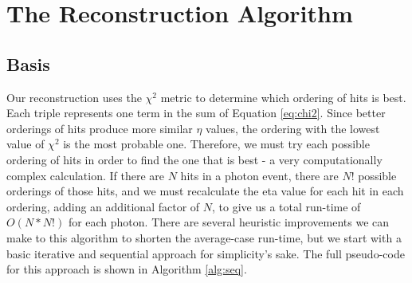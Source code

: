 \chapter{The Reconstruction Algorithm}

\section{Basis}

Our reconstruction uses the $\chi^2$ metric to determine which ordering of hits is best. Each triple represents one term in the sum of Equation \ref{eq:chi2}. Since better orderings of hits produce more similar $\eta$ values, the ordering with the lowest value of $\chi^2$ is the most probable one. Therefore, we must try each possible ordering of hits in order to find the one that is best - a very computationally complex calculation. If there are $N$ hits in a photon event, there are $N!$ possible orderings of those hits, and we must recalculate the eta value for each hit in each ordering, adding an additional factor of $N$, to give us a total run-time of $O(N*N!)$ for each photon. There are several heuristic improvements we can make to this algorithm to shorten the average-case run-time, but we start with a basic iterative and sequential approach for simplicity's sake. The full pseudo-code for this approach is shown in Algorithm \ref{alg:seq}.

